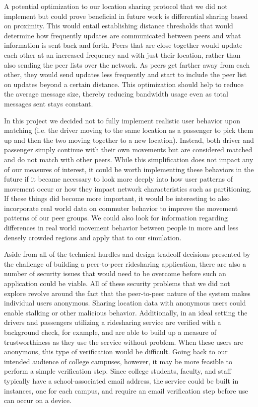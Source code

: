 \documentclass[letterpaper,11pt,twocolumn]{article}
\begin{document}
A potential optimization to our location sharing protocol that we did not implement but could prove beneficial in future work is differential sharing based on proximity. This would entail establishing distance thresholds that would determine how frequently updates are communicated between peers and what information is sent back and forth. Peers that are close together would update each other at an increased frequency and with just their location, rather than also sending the peer lists over the network. As peers get farther away from each other, they would send updates less frequently and start to include the peer list on updates beyond a certain distance. This optimization should help to reduce the average message size, thereby reducing bandwidth usage even as total messages sent stays constant.

In this project we decided not to fully implement realistic user behavior upon matching (i.e. the driver moving to the same location as a passenger to pick them up and then the two moving together to a new location). Instead, both driver and passenger simply continue with their own movements but are considered matched and do not match with other peers. While this simplification does not impact any of our measures of interest, it could be worth implementing these behaviors in the future if it became necessary to look more deeply into how user patterns of movement occur or how they impact network characteristics such as partitioning. If these things did become more important, it would be interesting to also incorporate real world data on commuter behavior to improve the movement patterns of our peer groups. We could also look for information regarding differences in real world movement behavior between people in more and less densely crowded regions and apply that to our simulation.

Aside from all of the technical hurdles and design tradeoff decisions presented by the challenge of building a peer-to-peer ridesharing application, there are also a number of security issues that would need to be overcome before such an application could be viable. All of these security problems that we did not explore revolve around the fact that the peer-to-peer nature of the system makes individual users anonymous. Sharing location data with anonymous users could enable stalking or other malicious behavior. Additionally, in an ideal setting the drivers and passengers utilizing a ridesharing service are verified with a background check, for example, and are able to build up a measure of trustworthiness as they use the service without problem. When these users are anonymous, this type of verification would be difficult. Going back to our intended audience of college campuses, however, it may be more feasible to perform a simple verification step. Since college students, faculty, and staff typically have a school-associated email address, the service could be built in instances, one for each campus, and require an email verification step before use can occur on a device.
\end{document}
